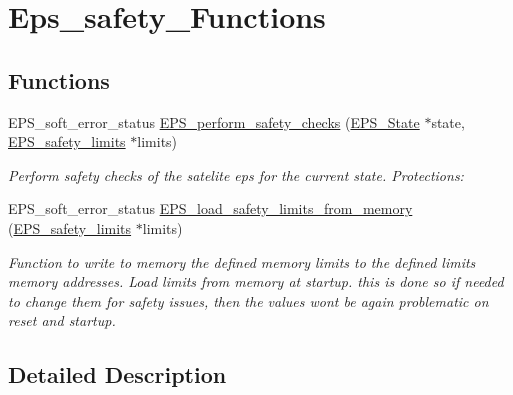 \hypertarget{group__eps__safety___functions}{\section{Eps\-\_\-safety\-\_\-\-Functions}
\label{group__eps__safety___functions}
}
\subsection*{Functions}
\begin{DoxyCompactItemize}
\item 
E\-P\-S\-\_\-soft\-\_\-error\-\_\-status \hyperlink{group__eps__safety___functions_ga2867775c8dee462ce7a20867e8582df0}{E\-P\-S\-\_\-perform\-\_\-safety\-\_\-checks} (\hyperlink{struct_e_p_s___state}{E\-P\-S\-\_\-\-State} $\ast$state, \hyperlink{struct_e_p_s__safety__limits}{E\-P\-S\-\_\-safety\-\_\-limits} $\ast$limits)
\begin{DoxyCompactList}\small\item\em Perform safety checks of the satelite eps for the current state. Protections\-: \end{DoxyCompactList}\item 
E\-P\-S\-\_\-soft\-\_\-error\-\_\-status \hyperlink{group__eps__safety___functions_ga39c4acaac6d5e9818c1570ca02c2e015}{E\-P\-S\-\_\-load\-\_\-safety\-\_\-limits\-\_\-from\-\_\-memory} (\hyperlink{struct_e_p_s__safety__limits}{E\-P\-S\-\_\-safety\-\_\-limits} $\ast$limits)
\begin{DoxyCompactList}\small\item\em Function to write to memory the defined memory limits to the defined limits memory addresses. Load limits from memory at startup. this is done so if needed to change them for safety issues, then the values wont be again problematic on reset and startup. \end{DoxyCompactList}\end{DoxyCompactItemize}


\subsection{Detailed Description}


